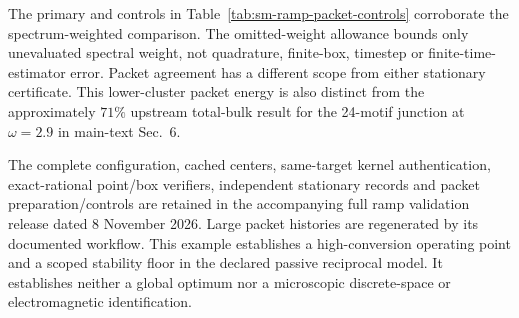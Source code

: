 The primary and controls in Table~\ref{tab:sm-ramp-packet-controls} corroborate the spectrum-weighted comparison. The omitted-weight allowance bounds only unevaluated spectral weight, not quadrature, finite-box, timestep or finite-time-estimator error. Packet agreement has a different scope from either stationary certificate. This lower-cluster packet energy is also distinct from the approximately $71\%$ upstream total-bulk result for the 24-motif junction at $\omega=2.9$ in main-text Sec.~6.

The complete configuration, cached centers, same-target kernel authentication, exact-rational point/box verifiers, independent stationary records and packet preparation/controls are retained in the accompanying full ramp validation release dated 8 November 2026. Large packet histories are regenerated by its documented workflow. This example establishes a high-conversion operating point and a scoped stability floor in the declared passive reciprocal model. It establishes neither a global optimum nor a microscopic discrete-space or electromagnetic identification.
\label{end:sm-ramp-validation}
\clearpage
